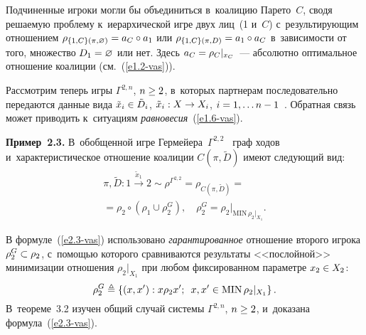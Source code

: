 \begin{multicols}{2}
    Подчиненные игроки могли бы объединиться в~коалицию Парето~$C$, сводя 
ре\-ша\-емую проб\-ле\-му к~иерархической игре двух лиц~(1 и~$C$) с~ре\-зуль\-ти\-ру\-ющим 
отношением $\rho_{\{1,C\} (\pi,\varnothing)} \hm= a_C \circ a_1$ или 
$\rho_{\{1,C\}(\pi,D)} \hm= a_1\circ a_C$ в~за\-ви\-си\-мости от того, множество 
$D_1\hm=\varnothing$ или нет. Здесь $a_C\hm= \rho_C\vert_{x_C}$~--- абсолютно 
оптимальное отношение коалиции (см.~(\ref{e1.2-vas})). 
    
    Рассмотрим теперь игры $\Gamma^{2,n}$, $n\hm\geq 2$, в~которых партнерам 
последовательно передаются данные вида $\tilde{x}_i \hm\in \tilde{D}_i$, 
$\tilde{x}_i: X\hm\to X_i$, $i\hm= 1,\ldots n\hm-1$~\cite{1-vas, 5-vas}. Обрат\-ная связь 
может приводить к~ситуациям \textit{равновесия}~(\ref{e1.6-vas}). 
    
    \textbf{Пример~2.3.} В~обоб\-щен\-ной игре  
Гермейера~$\Gamma^{2,2}$~\cite{1-vas} граф ходов и~характеристическое 
отношение коалиции $C(\pi, \tilde{D})$ име\-ют сле\-ду\-ющий вид:
    \begin{multline}
    \pi, \tilde{D}: \boxed{1} \overset{\tilde{x}_1}{\to} 
\boxed{2}\sim\rho^{\Gamma^{2,2}} = \rho_{C(\pi,\tilde{D})} ={}\\
    {}= \rho_2\circ \left( \rho_1\cup \rho_2^G\right), \quad \rho_2^G 
=\rho_2\vert_{\mathrm{MIN}\,\rho_2\vert_{X_1}}.
\label{e2.3-vas}
\end{multline}

    В формуле~(\ref{e2.3-vas}) использовано \textit{гарантированное} отношение 
второго игрока $\rho_2^G\hm\subset \rho_2$, с~по\-мощью которого срав\-ни\-ва\-ют\-ся 
результаты <<по\-слой\-ной>> минимизации отношения $\rho_2\vert_{X_1}$ при 
любом фиксированном па\-ра\-мет\-ре $x_2\hm\in X_2$:
    \begin{equation}
    \rho_2^G \triangleq \left\{ (x,x^\prime): x\rho_2 x^\prime;\enskip  x, x^\prime\in \mathrm{MIN}\,\rho_2\vert_{X_1}\right\}.
    \label{e2.4-vas}
    \end{equation}
В~тео\-ре\-ме~3.2 \mbox{изучен} общий случай сис\-те\-мы $\Gamma^{2,n}$, $n\hm\geq 2$,  
и~доказана формула~(\ref{e2.3-vas}). 


\end{multicols}
